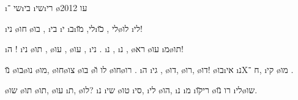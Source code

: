 \i{שי} 
 ־\i{בי}
\i{שי}\i{רי} 
 \o{עו}
2012


\i{ני} \o{חו} \o{בו} ,
\i{בי} \i{י} \i{ב}\i{לי},
\u{מו}\i{לי} , \u{כו}\o{לו} \i{לי}!



\i{ה} ! \i{ני} \o{תו}  ,
\o{עו} , \o{עו} , \i{ני}  .
 \i{נ} , \i{נ}  ,
 \o{רא} \o{עו} \i{מ}\o{תו}!



\u{נו} \o{בו}\o{נו} \o{מו},
\o{חו}\o{צו} \o{בו}  \o{לו}
\u{ו} \o{חו}\o{רו} .
\i{ה} \i{גי} ,
\o{דו}, \o{רו}, \o{דו}!
\o{בו}\i{אי} \i{נ}Xח ־,
\i{קי} \o{מו} .



 \o{שו} \o{תו}  \o{תו},
\o{עו}  \i{ת},   \o{לו}?
\i{נ}  \i{שי}  \o{טו}
 \i{סי}, \i{לי} \gnuva {} \o{הו},
\i{נ} \i{מ} \i{רי}\u{קו} \o{רו}
  \u{נו} \i{לי}\o{שו}.
